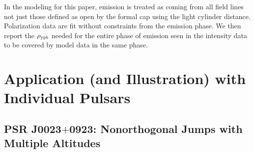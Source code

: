 In the modeling for this paper, emission 
is treated as coming from all field lines not just those defined as open by the formal
cap using the light cylinder distance.  Polarization data are fit 
without constraints from the emission phase.
We then report the $\rho_{\rm{ypt}}$
needed for the entire phase of emission seen in the intensity data
to be covered by model data in the same phase.  



\section{Application (and Illustration) with Individual Pulsars}
\label{sec:app}
\subsection{PSR J0023$+$0923: Nonorthogonal Jumps with Multiple Altitudes}



\label{sec:J0023}


\begin{table}[t!!]
\footnotesize
\caption{Fit Parameters for PSR J0023$+$0923}
\tabcolsep=0.19cm
\begin{center}
\def\arraystretch{2}
\label{tb:fitJ0023}
\end{center}
\end{table}



